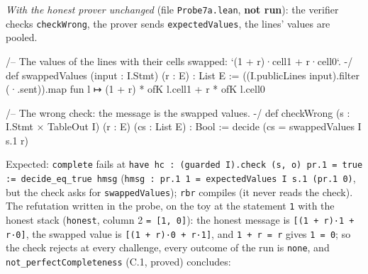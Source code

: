 \emph{With the honest prover unchanged} (file \texttt{Probe7a.\allowbreak{}lean}, \textbf{not run}): the verifier checks \texttt{checkWrong}, the prover sends \texttt{expectedValues}, the lines' values are pooled.

\begin{leancode}
/-- The values of the lines with their cells swapped: `(1 + r)·cell1 + r·cell0`. -/
def swappedValues (input : I.Stmt) (r : E) : List E :=
  ((I.publicLines input).filter (·.sent)).map fun l ↦ (1 + r) * ofK l.cell1 + r * ofK l.cell0

/-- The wrong check: the message is the swapped values. -/
def checkWrong (s : I.Stmt × TableOut I) (r : E) (cs : List E) : Bool :=
  decide (cs = swappedValues I s.1 r)
\end{leancode}

Expected: \texttt{complete} fails at \texttt{h\allowbreak{}a\allowbreak{}v\allowbreak{}e\allowbreak{} h\allowbreak{}c\allowbreak{} :\allowbreak{} (\allowbreak{}g\allowbreak{}u\allowbreak{}a\allowbreak{}r\allowbreak{}d\allowbreak{}e\allowbreak{}d\allowbreak{} I\allowbreak{})\allowbreak{}.\allowbreak{}c\allowbreak{}h\allowbreak{}e\allowbreak{}c\allowbreak{}k\allowbreak{} (\allowbreak{}s\allowbreak{},\allowbreak{} o\allowbreak{})\allowbreak{} p\allowbreak{}r\allowbreak{}.\allowbreak{}1\allowbreak{} =\allowbreak{} t\allowbreak{}r\allowbreak{}u\allowbreak{}e\allowbreak{} :\allowbreak{}=\allowbreak{} d\allowbreak{}e\allowbreak{}c\allowbreak{}i\allowbreak{}d\allowbreak{}e\allowbreak{}\_\allowbreak{}e\allowbreak{}q\allowbreak{}\_\allowbreak{}t\allowbreak{}r\allowbreak{}u\allowbreak{}e\allowbreak{} h\allowbreak{}m\allowbreak{}s\allowbreak{}g} (\texttt{h\allowbreak{}m\allowbreak{}s\allowbreak{}g\allowbreak{} :\allowbreak{} p\allowbreak{}r\allowbreak{}.\allowbreak{}1\allowbreak{} 1\allowbreak{} =\allowbreak{} e\allowbreak{}x\allowbreak{}p\allowbreak{}e\allowbreak{}c\allowbreak{}t\allowbreak{}e\allowbreak{}d\allowbreak{}V\allowbreak{}a\allowbreak{}l\allowbreak{}u\allowbreak{}e\allowbreak{}s\allowbreak{} I\allowbreak{} s\allowbreak{}.\allowbreak{}1\allowbreak{} (\allowbreak{}p\allowbreak{}r\allowbreak{}.\allowbreak{}1\allowbreak{} 0\allowbreak{})}, but the check asks for \texttt{swappedValues}); \texttt{rbr} compiles (it never reads the check). The refutation written in the probe, on the toy at the statement \texttt{1} with the honest stack (\texttt{honest}, column 2 \texttt{= [1,\allowbreak{} 0]}): the honest message is \texttt{[(\allowbreak{}1 + r)·1 + r·0]}, the swapped value is \texttt{[(\allowbreak{}1 + r)·0 + r·1]}, and \texttt{1 + r = r} gives \texttt{1 = 0}; so the check rejects at every challenge, every outcome of the run is \texttt{none}, and \texttt{not\_\allowbreak{}perfectCompleteness} (C.1, proved) concludes:

